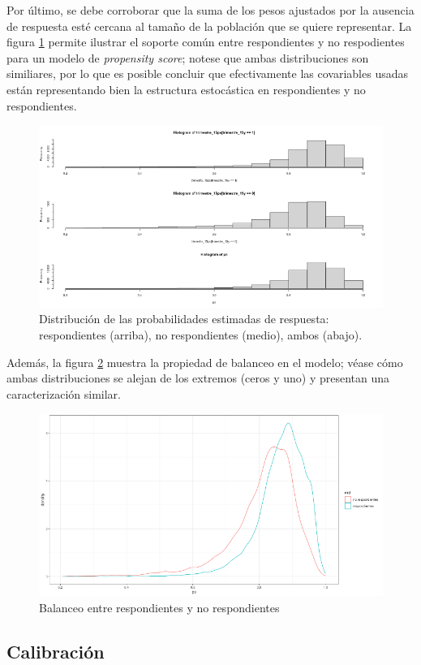 \documentclass[
  12pt,
  spanish,
]{book}
\begin{document}
Por último, se debe corroborar que la suma de los pesos ajustados por la ausencia de respuesta esté cercana al tamaño de la población que se quiere representar. La figura \ref{fig:figel3a} permite ilustrar el soporte común entre respondientes y no respodientes para un modelo de \emph{propensity score}; notese que ambas distribuciones son similiares, por lo que es posible concluir que efectivamente las covariables usadas están representando bien la estructura estocástica en respondientes y no respondientes.

\begin{figure}

{\centering \includegraphics[width=0.5\linewidth]{Pics/el3a} 

}

\caption{Distribución de las probabilidades estimadas de respuesta: respondientes (arriba), no respondientes (medio), ambos (abajo).}\label{fig:figel3a}
\end{figure}

Además, la figura \ref{fig:figel3b} muestra la propiedad de balanceo en el modelo; véase cómo ambas distribuciones se alejan de los extremos (ceros y uno) y presentan una caracterización similar.

\begin{figure}

{\centering \includegraphics[width=0.5\linewidth]{Pics/el3b} 

}

\caption{Balanceo entre respondientes y no respondientes}\label{fig:figel3b}
\end{figure}

\hypertarget{calibraciuxf3n}{%
\subsection{Calibración}\label{calibraciuxf3n}}
\end{document}
